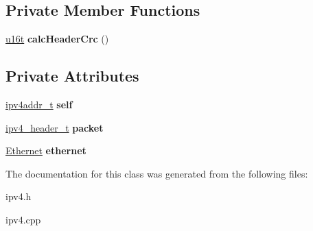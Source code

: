 \subsection*{Private Member Functions}
\begin{DoxyCompactItemize}
\item 
\mbox{\label{classIPv4_a302dbff73ecbbdf99d3552fb996362b9}} 
\hyperlink{macros_8h_a590a9a8f7df8fabfac6573e21da1922d}{u16t} {\bfseries calc\+Header\+Crc} ()
\end{DoxyCompactItemize}
\subsection*{Private Attributes}
\begin{DoxyCompactItemize}
\item 
\mbox{\label{classIPv4_a4288e410994ae3a739dc7e2a6aedeb90}} 
\hyperlink{unionipv4addr__t}{ipv4addr\+\_\+t} {\bfseries self}
\item 
\mbox{\label{classIPv4_abc94da213c7f9b909a96821315230fbc}} 
\hyperlink{structipv4__header__t}{ipv4\+\_\+header\+\_\+t} {\bfseries packet}
\item 
\mbox{\label{classIPv4_a0cded8cd68cb45095673e91d3739a15c}} 
\hyperlink{classEthernet}{Ethernet} {\bfseries ethernet}
\end{DoxyCompactItemize}


The documentation for this class was generated from the following files\+:\begin{DoxyCompactItemize}
\item 
ipv4.\+h\item 
ipv4.\+cpp\end{DoxyCompactItemize}
